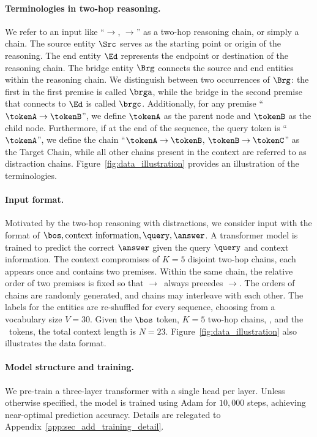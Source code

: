 \paragraph{Terminologies in two-hop reasoning.} We refer to an input like “\Src$\to$\brga, \brgb$\to$\Ed” as a two-hop reasoning chain, or simply a chain. The source entity $\Src$ serves as the starting point or origin of the reasoning. The end entity $\Ed$ represents the endpoint or destination of the reasoning chain. The bridge entity $\Brg$ connects the source and end entities within the reasoning chain. We distinguish between two occurrences of $\Brg$: the first in the first premise is called $\brga$, while the bridge in the second premise that connects to $\Ed$ is called $\brgc$. Additionally, for any premise ``$\tokenA \to \tokenB$'', we define $\tokenA$ as the parent node and $\tokenB$ as the child node. Furthermore, if at the end of the sequence, the query token is ``$\tokenA$'', we define the chain ``$\tokenA \to \tokenB$, $\tokenB \to \tokenC$'' as the Target Chain, while all other chains present in the context are referred to as distraction chains. Figure~\ref{fig:data_illustration} provides an illustration of the terminologies.

\paragraph{Input format.}
Motivated by the two-hop reasoning with distractions, we consider input with the format of $\bos, \text{context information}, \query, \answer$. A transformer model is trained to predict the correct $\answer$ given the query $\query$ and context information. The context compromises of $K=5$ disjoint two-hop chains, each appears once and contains two premises. Within the same chain, the relative order of two premises is fixed so that \Src$\to$\brga~always precedes \brgb$\to$\Ed. The orders of chains are randomly generated, and chains may interleave with each other. The labels for the entities are re-shuffled for every sequence, choosing from a vocabulary size $V=30$. Given the $\bos$ token, $K=5$ two-hop chains, \query, and the \answer~tokens, the total context length is $N=23$. Figure~\ref{fig:data_illustration} also illustrates the data format. 

\paragraph{Model structure and training.} We pre-train a three-layer transformer with a single head per layer. Unless otherwise specified, the model is trained using Adam for $10,000$ steps, achieving near-optimal prediction accuracy. Details are relegated to Appendix~\ref{app:sec_add_training_detail}.


